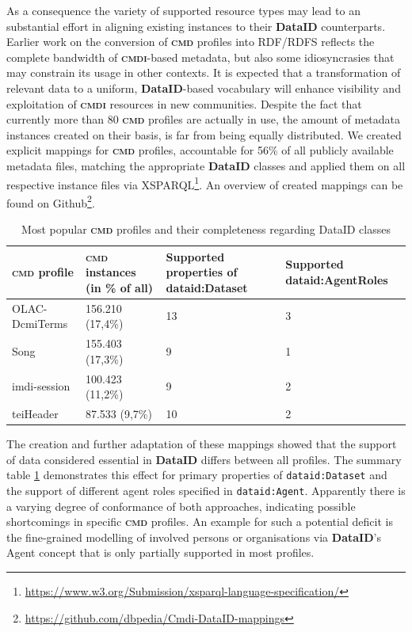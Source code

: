 \documentclass[a4paper,english,twoside,BCOR1.5cm,headsepline,DIV12,appendixprefix,final,12pt]{scrbook}
\newcommand{\dataid}{{\ttfamily\bfseries DataID}\xspace}
\newcommand{\cmdi}{{\scshape\bfseries cmdi}\xspace}
\newcommand{\cmd}{{\scshape\bfseries cmd}\xspace}
\newcommand{\prop}[1]{{{\texttt{#1}}}}
\newcommand\footnoteurl[1]{\footnote{\scriptsize\url{#1}}}
\begin{document}
As a consequence the variety of supported resource types may lead to an substantial effort in aligning existing instances to their \dataid counterparts. 
Earlier work on the conversion of \cmd profiles into RDF/RDFS\cite{DW2014} reflects the complete bandwidth of \cmdi-based metadata, but also some idiosyncrasies that may constrain its usage in other contexts. It is expected that a transformation of relevant data to a uniform, \dataid{}-based vocabulary will enhance visibility and exploitation of \cmdi resources in new communities.
Despite the fact that currently more than 80 \cmd profiles are actually in use, the amount of metadata instances created on their basis, is far from being equally distributed. 
We created explicit mappings for \cmd profiles, accountable for 56\% of all publicly available metadata files, matching the appropriate \dataid classes and applied them on all respective instance files via XSPARQL\footnoteurl{https://www.w3.org/Submission/xsparql-language-specification/}. An overview of created mappings can be found on Github\footnoteurl{https://github.com/dbpedia/Cmdi-DataID-mappings}. 

\begin{table}[t]
    \centering
    \begin{tabular}{l|p{3cm}|p{3cm}|p{3cm}}
        \hline
        \cmd profile & \cmd instances (in \% of all) & Supported properties of dataid:Dataset & Supported dataid:AgentRoles \\
        \hline
        OLAC-DcmiTerms & 156.210 (17,4\%) & 13 & 3 \\
        Song & 155.403 (17,3\%)& 9 & 1 \\
        imdi-session & 100.423 (11,2\%) & 9 & 2 \\
        teiHeader & 87.533 (9,7\%)& 10 & 2 \\
    \end{tabular}
    \caption{Most popular \cmd profiles and their completeness regarding DataID classes}
    \label{tab:cmdi_profiles}
\end{table}
The creation and further adaptation of these mappings showed that the support of data considered essential in \dataid differs between all profiles. The summary table \ref{tab:cmdi_profiles} demonstrates this effect for primary properties of \prop{dataid:Dataset} and the support of different agent roles specified in \prop{dataid:Agent}. Apparently there is a varying degree of conformance of both approaches, indicating possible shortcomings in specific \cmd profiles. An example for such a potential deficit is the fine-grained modelling of involved persons or organisations via \dataid{}'s Agent concept that is only partially supported in most profiles.
\end{document}
